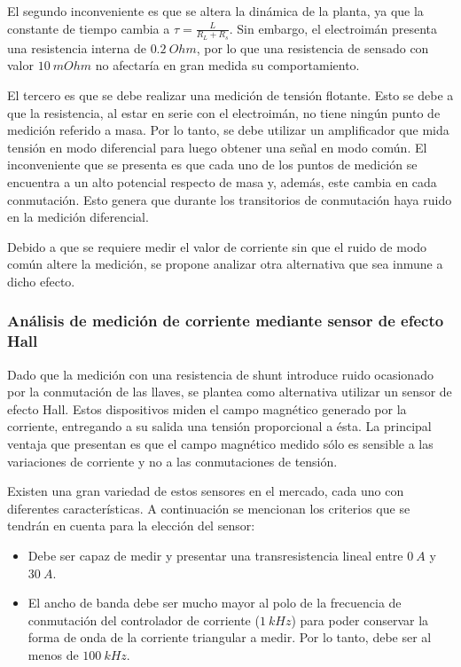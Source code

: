 El segundo inconveniente es que se altera la dinámica de la planta, ya que la constante de tiempo cambia a $\tau=\frac{L}{R_L+R_s}$. Sin embargo, el electroimán presenta una resistencia interna de $0.2\:Ohm$, por lo que una resistencia de sensado con valor $10\:mOhm$ no afectaría en gran medida su comportamiento.

El tercero es que se debe realizar una medición de tensión flotante. Esto se debe a que la resistencia, al estar en serie con el electroimán, no tiene ningún punto de medición referido a masa. Por lo tanto, se debe utilizar un amplificador que mida tensión en modo diferencial para luego obtener una señal en modo común. El inconveniente que se presenta es que cada uno de los puntos de medición se encuentra a un alto potencial respecto de masa y, además, este cambia en cada conmutación. Esto genera que durante los transitorios de conmutación haya ruido en la medición diferencial.

Debido a que se requiere medir el valor de corriente sin que el ruido de modo común altere la medición, se propone analizar otra alternativa que sea inmune a dicho efecto.


\subsubsection{Análisis de medición de corriente mediante sensor de efecto Hall}

Dado que la medición con una resistencia de shunt introduce ruido ocasionado por la conmutación de las llaves, se plantea como alternativa utilizar un sensor de efecto Hall. Estos dispositivos miden el campo magnético generado por la corriente, entregando a su salida una tensión proporcional a ésta. La principal ventaja que presentan es que el campo magnético medido sólo es sensible a las variaciones de corriente y no a las conmutaciones de tensión.

Existen una gran variedad de estos sensores en el mercado, cada uno con diferentes características. A continuación se mencionan los criterios que se tendrán en cuenta para la elección del sensor:

\begin{itemize}
	\item Debe ser capaz de medir y presentar una transresistencia lineal entre $0\:A$ y $30\:A$.
	\item El ancho de banda debe ser mucho mayor al polo de la frecuencia de conmutación del controlador de corriente ($1\:kHz$) para poder conservar la forma de onda de la corriente triangular a medir. Por lo tanto, debe ser al menos de $100\:kHz$.	
\end{itemize}


